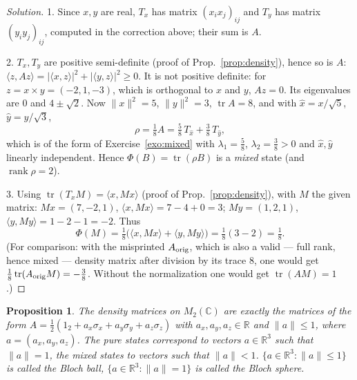 \documentclass[11pt,a4paper]{article}
\numberwithin{equation}{section}
\newcommand{\R}{\mathbb{R}}
\newcommand{\C}{\mathbb{C}}
\newcommand{\ip}[2]{\langle #1, #2\rangle}
\DeclareMathOperator{\tr}{tr}
\DeclareMathOperator{\rank}{rank}
\theoremstyle{plain}
\newtheorem{proposition}[theorem]{Proposition}
\theoremstyle{definition}
\theoremstyle{plain}
\theoremstyle{definition}
\newenvironment{solution}{\begin{proof}[Solution]}{\end{proof}}
\begin{document}
\begin{solution}
1. Since $x,y$ are real, $T_x$ has matrix $(x_ix_j)_{ij}$ and $T_y$ has matrix $(y_iy_j)_{ij}$,
computed in the correction above; their sum is $A$.

2. $T_x,T_y$ are positive semi-definite (proof of Prop.~\ref{prop:density}), hence so is
$A$: $\ip{z}{Az}=|\ip{x}{z}|^2+|\ip{y}{z}|^2\ge0$. It is not positive definite: for
$z=x\times y=(-2,1,-3)$, which is orthogonal to $x$ and $y$, $Az=0$. Its eigenvalues are
$0$ and $4\pm\sqrt2$. Now $\|x\|^2=5$, $\|y\|^2=3$, $\tr A=8$, and with
$\hat x=x/\sqrt5$, $\hat y=y/\sqrt3$,
\[
\rho=\tfrac18A=\tfrac58\,T_{\hat x}+\tfrac38\,T_{\hat y},
\]
which is of the form of Exercise~\ref{exo:mixed} with $\lambda_1=\frac58$,
$\lambda_2=\frac38>0$ and $\hat x,\hat y$ linearly independent. Hence
$\Phi(B)=\tr(\rho B)$ is a \emph{mixed} state (and $\rank\rho=2$).

3. Using $\tr(T_xM)=\ip{x}{Mx}$ (proof of Prop.~\ref{prop:density}), with $M$ the given
matrix: $Mx=(7,-2,1)$, $\ip{x}{Mx}=7-4+0=3$; $My=(1,2,1)$, $\ip{y}{My}=1-2-1=-2$. Thus
\[
\Phi(M)=\tfrac18\big(\ip{x}{Mx}+\ip{y}{My}\big)=\tfrac18(3-2)=\tfrac18 .
\]
(For comparison: with the misprinted $A_{\rm orig}$, which is also a valid --- full rank,
hence mixed --- density matrix after division by its trace $8$, one would get
$\frac18\tr(A_{\rm orig}M)=-\frac38$. Without the normalization one would get
$\tr(AM)=1$.)
\end{solution}

\begin{proposition}\label{prop:bloch}
The density matrices on $M_2(\C)$ are exactly the matrices of the form
$A=\frac12(1_2+a_x\sigma_x+a_y\sigma_y+a_z\sigma_z)$ with $a_x,a_y,a_z\in\R$ and
$\|a\|\le1$, where $a=(a_x,a_y,a_z)$. The pure states correspond to vectors $a\in\R^3$ such
that $\|a\|=1$, the mixed states to vectors such that $\|a\|<1$.
$\{a\in\R^3:\|a\|\le1\}$ is called the \emph{Bloch ball}, $\{a\in\R^3:\|a\|=1\}$ is called
the \emph{Bloch sphere}.
\end{proposition}
\end{document}
